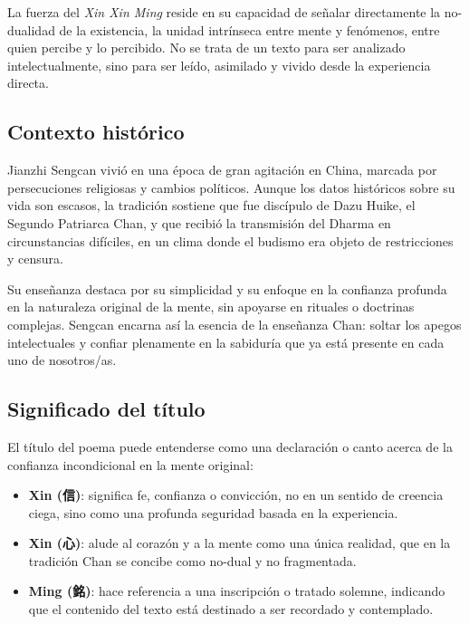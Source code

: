 \documentclass[
  a5paperpaper,
]{article}
\providecommand{\tightlist}{%
  \setlength{\itemsep}{0pt}\setlength{\parskip}{0pt}}
\begin{document}
La fuerza del \emph{Xin Xin Ming} reside en su capacidad de señalar
directamente la no-dualidad de la existencia, la unidad intrínseca entre
mente y fenómenos, entre quien percibe y lo percibido. No se trata de un
texto para ser analizado intelectualmente, sino para ser leído,
asimilado y vivido desde la experiencia directa.

\hypertarget{contexto-histuxf3rico}{%
\subsection{Contexto histórico}\label{contexto-histuxf3rico}}

Jianzhi Sengcan vivió en una época de gran agitación en China, marcada
por persecuciones religiosas y cambios políticos. Aunque los datos
históricos sobre su vida son escasos, la tradición sostiene que fue
discípulo de Dazu Huike, el Segundo Patriarca Chan, y que recibió la
transmisión del Dharma en circunstancias difíciles, en un clima donde el
budismo era objeto de restricciones y censura.

Su enseñanza destaca por su simplicidad y su enfoque en la confianza
profunda en la naturaleza original de la mente, sin apoyarse en rituales
o doctrinas complejas. Sengcan encarna así la esencia de la enseñanza
Chan: soltar los apegos intelectuales y confiar plenamente en la
sabiduría que ya está presente en cada uno de nosotros/as.

\hypertarget{significado-del-tuxedtulo}{%
\subsection{Significado del título}\label{significado-del-tuxedtulo}}

El título del poema puede entenderse como una declaración o canto acerca
de la confianza incondicional en la mente original:

\begin{itemize}
\tightlist
\item
  \textbf{Xin (信)}: significa fe, confianza o convicción, no en un
  sentido de creencia ciega, sino como una profunda seguridad basada en
  la experiencia.
\item
  \textbf{Xin (心)}: alude al corazón y a la mente como una única
  realidad, que en la tradición Chan se concibe como no-dual y no
  fragmentada.
\item
  \textbf{Ming (銘)}: hace referencia a una inscripción o tratado
  solemne, indicando que el contenido del texto está destinado a ser
  recordado y contemplado.
\end{itemize}
\end{document}
